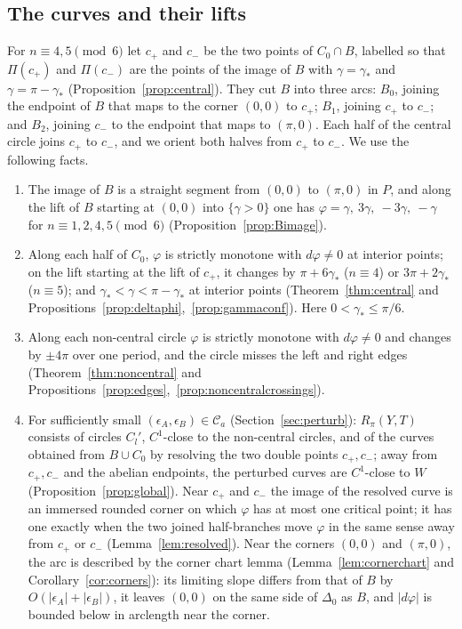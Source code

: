 \subsection{The curves and their lifts}\label{ss:curves}
For $n\equiv4,5\pmod 6$ let $c_+$ and $c_-$ be the two points of $C_0\cap B$, labelled so that $\Pi(c_+)$ and
$\Pi(c_-)$ are the points of the image of $B$ with $\gamma=\gamma_*$ and $\gamma=\pi-\gamma_*$
(Proposition~\ref{prop:central}). They cut $B$ into three arcs: $B_0$, joining the endpoint of $B$ that maps
to the corner $(0,0)$ to $c_+$; $B_1$, joining $c_+$ to $c_-$; and $B_2$, joining $c_-$ to the endpoint that maps to
$(\pi,0)$. Each half of the central circle joins $c_+$ to $c_-$, and we orient both halves from $c_+$ to $c_-$. We
use the following facts.
\begin{enumerate}
\item[(F1)] The image of $B$ is a straight segment from $(0,0)$ to $(\pi,0)$ in $P$, and along the lift of $B$
starting at $(0,0)$ into $\{\gamma>0\}$ one has $\varphi=\gamma,\ 3\gamma,\ -3\gamma,\ -\gamma$ for
$n\equiv1,2,4,5\pmod6$ (Proposition~\ref{prop:Bimage}).
\item[(F2)] Along each half of $C_0$, $\varphi$ is strictly monotone with $d\varphi\neq0$ at interior points; on
the lift starting at the lift of $c_+$, it changes by $\pi+6\gamma_*$ ($n\equiv4$) or $3\pi+2\gamma_*$ ($n\equiv5$); and
$\gamma_*<\gamma<\pi-\gamma_*$ at interior points (Theorem~\ref{thm:central} and
Propositions~\ref{prop:deltaphi},~\ref{prop:gammaconf}). Here $0<\gamma_*\le\pi/6$.
\item[(F3)] Along each non-central circle $\varphi$ is strictly monotone with $d\varphi\neq0$ and changes by $\pm4\pi$
over one period, and the circle misses the left and right edges (Theorem~\ref{thm:noncentral} and
Propositions~\ref{prop:edges},~\ref{prop:noncentralcrossings}).
\item[(F4)] For sufficiently small $(\epsilon_A,\epsilon_B)\in\mathcal C_a$ (Section~\ref{sec:perturb}): $R_\pi(Y,T)$ consists of circles $C_l'$,
$C^1$-close to the non-central circles, and of the curves obtained from $B\cup C_0$ by resolving the two
double points $c_+,c_-$; away from $c_+,c_-$ and the abelian endpoints, the perturbed curves are $C^1$-close to
$W$ (Proposition~\ref{prop:global}). Near $c_+$ and $c_-$ the image of the resolved curve is an immersed
rounded corner on which $\varphi$ has at most one critical point; it has one exactly when the two joined
half-branches move $\varphi$ in the same sense away from $c_+$ or $c_-$ (Lemma~\ref{lem:resolved}).
Near the corners $(0,0)$ and $(\pi,0)$, the arc is described by the corner chart lemma
(Lemma~\ref{lem:cornerchart} and Corollary~\ref{cor:corners}): its limiting slope differs from that of $B$ by $O(|\epsilon_A|+|\epsilon_B|)$, it leaves $(0,0)$ on the same
side of $\Delta_0$ as $B$, and $|d\varphi|$ is bounded below in arclength near the corner.
\end{enumerate}

